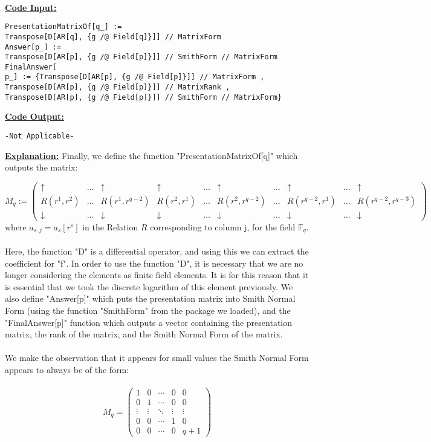\documentclass[11pt]{article}
\theoremstyle{plain}
\theoremstyle{definition}
\begin{document}
\\
\textbf{\underline{Code Input:}}
\begin{verbatim}
PresentationMatrixOf[q_] := 
Transpose[D[AR[q], {g /@ Field[q]}]] // MatrixForm
Answer[p_] := 
Transpose[D[AR[p], {g /@ Field[p]}]] // SmithForm // MatrixForm
FinalAnswer[
p_] := {Transpose[D[AR[p], {g /@ Field[p]}]] // MatrixForm , 
Transpose[D[AR[p], {g /@ Field[p]}]] // MatrixRank , 
Transpose[D[AR[p], {g /@ Field[p]}]] // SmithForm // MatrixForm}
\end{verbatim}
\textbf{\underline{Code Output:}}
\begin{verbatim}
-Not Applicable-
\end{verbatim}
\textbf{\underline{Explanation:}} Finally, we define the function "PresentationMatrixOf[q]" which outputs the matrix:

\[ M_q := \left( \begin{array}{ccccccccccc}
\uparrow  & \dots  & \uparrow &  \uparrow &   \dots &  \uparrow & \dots  & \uparrow  & \dots & \uparrow \\
R(r^1, r^2) &   \dots &  R(r^1, r^{q-2}) & R(r^2, r^1)  & \dots & R(r^2, r^{q-2}) & \dots &  R(r^{q-2}, r^1) & \dots & R(r^{q-2}, r^{q-3})  \\
\downarrow  & \dots  & \downarrow &  \downarrow  & \dots &  \downarrow & \dots  & \downarrow & \dots & \downarrow \end{array} \right)\] 
where $a_{s,j} = a_s [r^s]$  in the Relation $R$ corresponding to column j, for the field $\mathbb{F}_q$.\\
\\
Here, the function "D" is a differential operator, and using this we can extract the coefficient for "f". In order to use the function "D", it is necessary that we are no longer considering the elements as finite field elements. It is for this reason that it is essential that we took the discrete logarithm of this element previously. We also define "Answer[p]" which puts the presentation matrix into Smith Normal Form (using the function "SmithForm" from the package we loaded), and the "FinalAnswer[p]" function which outputs a vector containing the presentation matrix, the rank of the matrix, and the Smith Normal Form of the matrix.\\
\\
We make the observation that it appears for small values the Smith Normal Form appears to always be of the form:\\
\\
\[ M_q = \left( \begin{array}{ccccc}
1 &0&\cdots&0&0 \\
0&1&\cdots&0&0\\
\vdots&\vdots&\ddots&\vdots&\vdots\\ 
0&0&\cdots&1&0\\
0&0& \cdots& 0& q+1
\end{array}\right) \]
\end{document}
